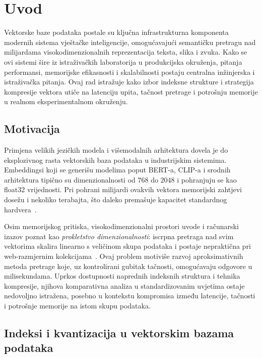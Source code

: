 \section{Uvod}
\label{sec:uvod}

Vektorske baze podataka postale su ključna infrastrukturna komponenta
modernih sistema vještačke inteligencije, omogućavajući semantičku pretragu
nad milijardama visokodimenzionalnih reprezentacija teksta, slika i zvuka.
Kako se ovi sistemi šire iz istraživačkih laboratorija u produkcijska
okruženja, pitanja performansi, memorijske efikasnosti i skalabilnosti
postaju centralna inžinjerska i istraživačka pitanja. Ovaj rad istražuje
kako izbor indeksne strukture i strategija kompresije vektora utiče na
latenciju upita, tačnost pretrage i potrošnju memorije u realnom
eksperimentalnom okruženju.

\subsection{Motivacija}
\label{sec:motivacija}

Primjena velikih jezičkih modela i višemodalnih arhitektura dovela je do
eksplozivnog rasta vektorskih baza podataka u industrijskim sistemima.
Embeddingsi koji se generišu modelima poput BERT-a, CLIP-a i srodnih
arhitektura tipično su dimenzionalnosti od $768$ do $2048$ i pohranjuju se
kao \foreignlanguage{english}{float32} vrijednosti.
Pri pohrani milijardi ovakvih vektora memorijski zahtjevi dosežu i
nekoliko terabajta, što daleko premašuje kapacitet standardnog
hardvera~\cite{raja2026memory}.

Osim memorijskog pritiska, visokodimenzionalni prostori uvode i
računarski izazov poznat kao \emph{prokletstvo dimenzionalnosti}: iscrpna
pretraga nad svim vektorima skalira linearno s veličinom skupa podataka
i postaje nepraktična pri web-razmjernim kolekcijama~\cite{ma2026comprehensive}.
Ovaj problem motiviše razvoj aproksimativnih metoda pretrage koje,
uz kontrolirani gubitak tačnosti, omogućavaju odgovore u milisekundama.
Uprkos dostupnosti naprednih indeksnih struktura i tehnika kompresije,
njihova komparativna analiza u standardizovanim uvjetima ostaje
nedovoljno istražena, posebno u kontekstu kompromisa između latencije,
tačnosti i potrošnje memorije na istom skupu podataka.

\subsection{Indeksi i kvantizacija u vektorskim bazama podataka}
\label{sec:pregled_tehnika}

